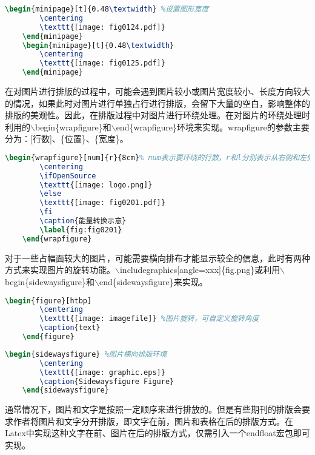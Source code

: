 \documentclass[cn,10pt,math=newtx,citestyle=gb7714-2015,bibstyle=gb7714-2015]{elegantbook}
\begin{document}
\begin{lstlisting}[language=tex]
	\begin{minipage}[t]{0.48\textwidth} %设置图形宽度
		\centering
		\texttt{[image: fig0124.pdf]}  
	\end{minipage}
	\begin{minipage}[t]{0.48\textwidth}
		\centering
		\texttt{[image: fig0125.pdf]}  
	\end{minipage}
\end{lstlisting}

在对图片进行排版的过程中，可能会遇到图片较小或图片宽度较小、长度方向较大的情况，如果此时对图片进行单独占行进行排版，会留下大量的空白，影响整体的排版的美观性。因此，在排版过程中对图片进行环绕处理。在对图片的环绕处理时利用的$\backslash$begin\{wrapfigure\}和$\backslash$end\{wrapfigure\}环境来实现。wrapfigure的参数主要分为：[行数]、\{位置\}、\{宽度\}。

\begin{lstlisting}[language=tex]
	\begin{wrapfigure}[num]{r}{8cm}% num表示要环绕的行数，r和l分别表示从右侧和左侧环绕；8cm为环绕留给图形的宽度
		\centering
		\ifOpenSource
		\texttt{[image: logo.png]}
		\else
		\texttt{[image: fig0201.pdf]}
		\fi
		\caption{能量转换示意}
		\label{fig:fig0201}
	\end{wrapfigure}
\end{lstlisting}


对于一些占幅面较大的图片，可能需要横向排布才能显示较全的信息，此时有两种方式来实现图片的旋转功能。$\backslash$includegraphics[angle=xxx]\{fig.png\}或利用$\backslash$begin\{sidewaysfigure\}和$\backslash$end\{sidewaysfigure\}来实现。
\begin{lstlisting}[language=tex]
	\begin{figure}[htbp]
		\centering
		\texttt{[image: imagefile]} %图片旋转，可自定义旋转角度
		\caption{text}
	\end{figure}
\end{lstlisting}

\begin{lstlisting}[language=tex]
	\begin{sidewaysfigure} %图片横向排版环境
		\centering 
		\texttt{[image: graphic.eps]} 
		\caption{Sidewaysfigure Figure} 
	\end{sidewaysfigure}
\end{lstlisting}

通常情况下，图片和文字是按照一定顺序来进行排放的。但是有些期刊的排版会要求作者将图片和文字分开排版，即文字在前，图片和表格在后的排版方式。在Latex中实现这种文字在前、图片在后的排版方式，仅需引入一个endfloat宏包即可实现。
\end{document}
